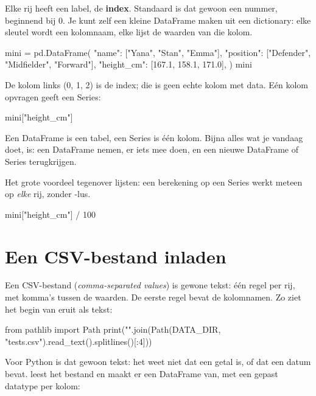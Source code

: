 \documentclass[11pt,a4paper]{article}
\begin{document}
Elke rij heeft een label, de \textbf{index}. Standaard is dat gewoon een
nummer, beginnend bij 0. Je kunt zelf een kleine DataFrame maken uit een
dictionary: elke sleutel wordt een kolomnaam, elke lijst de waarden van
die kolom.

\begin{python}
mini = pd.DataFrame({
    "name": ["Yana", "Stan", "Emma"],
    "position": ["Defender", "Midfielder", "Forward"],
    "height_cm": [167.1, 158.1, 171.0],
})
mini
\end{python}

De kolom links (0, 1, 2) is de index; die is geen echte kolom met data.
Eén kolom opvragen geeft een Series:

\begin{python}
mini["height_cm"]
\end{python}

\begin{kernidee}
Een DataFrame is een tabel, een Series is één kolom. Bijna alles wat je
vandaag doet, is: een DataFrame nemen, er iets mee doen, en een nieuwe
DataFrame of Series terugkrijgen.
\end{kernidee}

Het grote voordeel tegenover lijsten: een berekening op een Series werkt
meteen op \emph{elke} rij, zonder -lus.

\begin{python}
mini["height_cm"] / 100
\end{python}

\section{Een CSV-bestand inladen}

Een CSV-bestand (\emph{comma-separated values}) is gewone tekst: één
regel per rij, met komma's tussen de waarden. De eerste regel bevat de
kolomnamen. Zo ziet het begin van  eruit als tekst:

\begin{python}[outonly]
from pathlib import Path
print("\n".join(Path(DATA_DIR, "tests.csv").read_text().splitlines()[:4]))
\end{python}

Voor Python is dat gewoon tekst: het weet niet dat  een getal
is, of dat  een datum bevat.  leest het
bestand en maakt er een DataFrame van, met een gepast datatype per
kolom:
\end{document}
